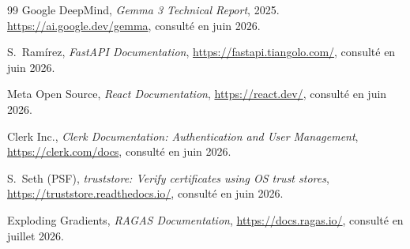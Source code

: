 \begin{thebibliography}{99}
Google DeepMind, \emph{Gemma 3 Technical Report}, 2025.
\url{https://ai.google.dev/gemma}, consulté en juin 2026.

S.~Ramírez, \emph{FastAPI Documentation}, \url{https://fastapi.tiangolo.com/},
consulté en juin 2026.

Meta Open Source, \emph{React Documentation}, \url{https://react.dev/},
consulté en juin 2026.

Clerk Inc., \emph{Clerk Documentation: Authentication and User Management},
\url{https://clerk.com/docs}, consulté en juin 2026.

S.~Seth (PSF), \emph{truststore: Verify certificates using OS trust stores},
\url{https://truststore.readthedocs.io/}, consulté en juin 2026.

Exploding Gradients, \emph{RAGAS Documentation}, \url{https://docs.ragas.io/},
consulté en juillet 2026.

\end{thebibliography}
